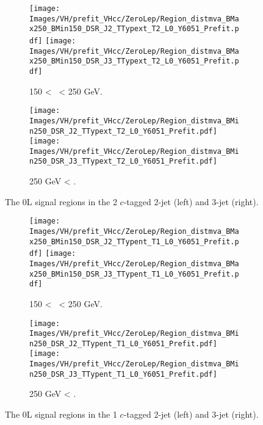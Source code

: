 \vspace*{\fill}

\begin{figure}[h!]
    \centering
    \begin{subfigure}[b]{\textwidth}
        \centering
        \texttt{[image: Images/VH/prefit\_VHcc/ZeroLep/Region\_distmva\_BMax250\_BMin150\_DSR\_J2\_TTypext\_T2\_L0\_Y6051\_Prefit.pdf]}
        \texttt{[image: Images/VH/prefit\_VHcc/ZeroLep/Region\_distmva\_BMax250\_BMin150\_DSR\_J3\_TTypext\_T2\_L0\_Y6051\_Prefit.pdf]}
        \caption{150 < \ptv\ < 250 GeV.}
        \label{fig:plots_VHcc_OL_150_SR_2c}
    \end{subfigure}
    \begin{subfigure}[b]{\textwidth}
        \centering
        \texttt{[image: Images/VH/prefit\_VHcc/ZeroLep/Region\_distmva\_BMin250\_DSR\_J2\_TTypext\_T2\_L0\_Y6051\_Prefit.pdf]}
        \texttt{[image: Images/VH/prefit\_VHcc/ZeroLep/Region\_distmva\_BMin250\_DSR\_J3\_TTypext\_T2\_L0\_Y6051\_Prefit.pdf]}
        \caption{250 GeV < \ptv.}
        \label{fig:plots_VHcc_OL_250_SR_2c}
    \end{subfigure}
    \caption{The 0L signal regions in the 2 $c$-tagged 2-jet (left) and 3-jet (right).}
    \label{fig:plots_VHcc_OL_SR_2c}
\end{figure} 
\begin{figure}[h!]
    \centering
    \begin{subfigure}[b]{\textwidth}
        \centering
        \texttt{[image: Images/VH/prefit\_VHcc/ZeroLep/Region\_distmva\_BMax250\_BMin150\_DSR\_J2\_TTypent\_T1\_L0\_Y6051\_Prefit.pdf]}
        \texttt{[image: Images/VH/prefit\_VHcc/ZeroLep/Region\_distmva\_BMax250\_BMin150\_DSR\_J3\_TTypent\_T1\_L0\_Y6051\_Prefit.pdf]}
        \caption{150 < \ptv\ < 250 GeV.}
        \label{fig:plots_VHcc_OL_150_SR_1c}
    \end{subfigure}
    \begin{subfigure}[b]{\textwidth}
        \centering
        \texttt{[image: Images/VH/prefit\_VHcc/ZeroLep/Region\_distmva\_BMin250\_DSR\_J2\_TTypent\_T1\_L0\_Y6051\_Prefit.pdf]}
        \texttt{[image: Images/VH/prefit\_VHcc/ZeroLep/Region\_distmva\_BMin250\_DSR\_J3\_TTypent\_T1\_L0\_Y6051\_Prefit.pdf]}
        \caption{250 GeV < \ptv.}
        \label{fig:plots_VHcc_OL_250_SR_1c}
    \end{subfigure}
    \caption{The 0L signal regions in the 1 $c$-tagged 2-jet (left) and 3-jet (right).}
    \label{fig:plots_VHcc_OL_SR_1c}
\end{figure} 

